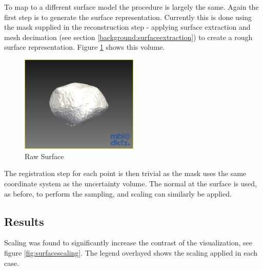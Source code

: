 To map to a different surface model the procedure is largely the same. Again the first step is to generate the surface representation. Currently this is done using the mask supplied in the reconstruction step - applying surface extraction and mesh decimation (see section \ref{background:surfaceextraction}) to create a rough surface representation. Figure \ref{fig:surfaceraw} shows this volume.

\begin{figure}[H]
  \centering
  \includegraphics[width=0.5\textwidth]{images/surface/surface_raw.png}
  \caption{Raw Surface}\label{fig:surfaceraw}
\end{figure}

The registration step for each point is then trivial as the mask uses the same coordinate system as the uncertainty volume. The normal at the surface is used, as before, to perform the sampling, and scaling can similarly be applied.

\newpage
\subsection*{Results}
Scaling was found to significantly increase the contrast of the visualization, see figure \ref{fig:surfacescaling}. The legend overlayed shows the scaling applied in each case.

